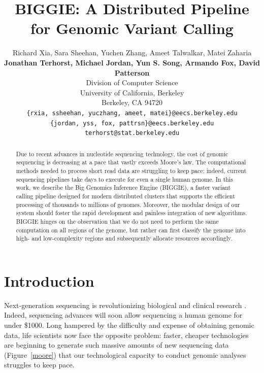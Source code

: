 \documentclass[12pt]{article}
\begin{document}
\title{BIGGIE: A Distributed Pipeline for Genomic Variant Calling}
\author{
Richard Xia, Sara Sheehan, Yuchen Zhang, Ameet Talwalkar, Matei Zaharia \\
\textbf{Jonathan Terhorst, Michael Jordan, Yun S. Song, Armando Fox, David Patterson} \\
Division of Computer Science\\
University of California, Berkeley\\
Berkeley, CA 94720 \\
\texttt{\{rxia, ssheehan, yuczhang, ameet, matei\}@eecs.berkeley.edu} \\
\texttt{\{jordan, yss, fox, pattrsn\}@eecs.berkeley.edu} \\
\texttt{terhorst@stat.berkeley.edu}
}
\maketitle

\begin{abstract}
Due to recent advances in nucleotide sequencing technology, the cost of genomic
sequencing is decreasing at a pace that vastly exceeds Moore's law.  The
computational methods needed to process short read data are struggling to keep
pace; indeed, current sequencing pipelines take days to execute for even a
single human genome.  In this work, we describe the Big Genomics Inference
Engine (BIGGIE), a faster variant calling pipeline designed for modern
distributed clusters that supports the efficient processing of thousands to
millions of genomes.  Moreover, the modular design of our system should foster
the rapid development and painless integration of new algorithms.  BIGGIE
hinges on the observation that we do not need to perform the same computation
on all regions of the genome, but rather can first classify the genome into
high- and low-complexity regions and subsequently allocate resources
accordingly.
\end{abstract}

\twocolumn

\section{Introduction}
Next-generation sequencing is revolutionizing biological and clinical research
\cite{schuster}.  Indeed, sequencing advances will soon allow sequencing a
human genome for under \$1000. Long hampered by the difficulty and
expense of obtaining genomic data, life scientists now face the opposite
problem: faster, cheaper technologies are beginning to generate such massive
amounts of new sequencing data (Figure~\ref{moore}) that our technological
capacity to conduct genomic analyses struggles to keep pace. 
\end{document}
